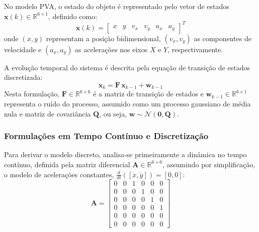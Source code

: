 \documentclass[journal]{IEEEtran}
\begin{document}
No modelo PVA, o estado do objeto é representado pelo vetor de estados $\mathbf{x}(k) \in \mathbb{R}^{6\times 1}$, definido como:
\begin{equation}
    \label{eq:modelPVA}
    \mathbf{x}(k) = \begin{bmatrix} x & y & v_x & v_y & a_x & a_y \end{bmatrix}^T
\end{equation}
onde $(x, y)$ representam a posição bidimensional, $(v_x, v_y)$ as componentes de velocidade e $(a_x, a_y)$ as acelerações nos eixos $X$ e $Y$, respectivamente.

A evolução temporal do sistema é descrita pela equação de transição de estados discretizada:
\begin{equation}
    \label{eq:eqTransEstados}
    \mathbf{x}_k = \mathbf{F}\, \mathbf{x}_{k-1} + \mathbf{w}_{k-1}
\end{equation}
Nesta formulação, $\mathbf{F} \in \mathbb{R}^{6\times6}$ é a matriz de transição de estados e $\mathbf{w}_{k-1} \in \mathbb{R}^{6\times1}$ representa o ruído do processo, assumido como um processo gaussiano de média nula e matriz de covariância $\mathbf{Q}$, ou seja, $\mathbf{w} \sim \mathcal{N}(\mathbf{0}, \mathbf{Q})$.

\subsubsection{Formulações em Tempo Contínuo e Discretização}

Para derivar o modelo discreto, analisa-se primeiramente a dinâmica no tempo contínuo, definida pela matriz diferencial $\mathbf{A} \in \mathbb{R}^{6 \times 6}$, assumindo por simplificação, o modelo de acelerações constantes, $\frac{d}{dt}\left([\ddot{x}, \ddot{y}]\right) = [0,0]$:
\begin{equation}
    \mathbf{A} = \begin{bmatrix} 
    0 & 0 & 1 & 0 & 0 & 0 \\ 
    0 & 0 & 0 & 1 & 0 & 0 \\ 
    0 & 0 & 0 & 0 & 1 & 0 \\ 
    0 & 0 & 0 & 0 & 0 & 1 \\ 
    0 & 0 & 0 & 0 & 0 & 0 \\ 
    0 & 0 & 0 & 0 & 0 & 0 
    \end{bmatrix}
\end{equation}
\end{document}
